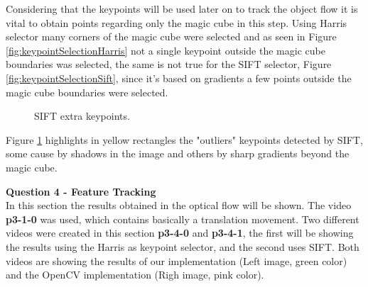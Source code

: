 \documentclass[12pt,a4paper]{article}
\begin{document}
	Considering that the keypoints will be used later on to track the object flow it is vital to obtain points regarding only the magic cube in this step. Using Harris selector many corners of the magic cube were selected and as seen in Figure \ref{fig:keypointSelectionHarris} not a single keypoint outside the magic cube boundaries was selected, the same is not true for the SIFT selector, Figure \ref{fig:keypointSelectionSift}, since it's based on gradients a few points outside the magic cube boundaries were selected.
	
\begin{figure}[!h]
	\centering
	{
		\setlength{\fboxsep}{1pt}
		\setlength{\fboxrule}{1pt}
	}
	\caption{SIFT extra keypoints.}
	\label{fig:keypointSelectionSiftPoints}
\end{figure}

	Figure \ref{fig:keypointSelectionSiftPoints} highlights in yellow rectangles the "outliers" keypoints detected by SIFT, some cause by shadows in the image and others by sharp gradients beyond the magic cube.\\


\newpage

\textbf{\LARGE Question 4 - Feature Tracking} \\

In this section the results obtained in the optical flow will be shown. The video \textbf{p3-1-0} was used, which contains basically a translation movement. Two different videos were created in this section \textbf{p3-4-0} and \textbf{p3-4-1}, the first will be showing the results using the Harris as keypoint selector, and the second uses SIFT. Both videos are showing the results of our implementation (Left image, green color) and the OpenCV implementation (Righ image, pink color). \\
\end{document}

